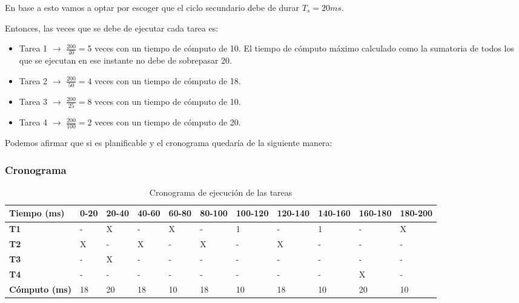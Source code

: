 \documentclass[a4paper,12pt]{article}
\begin{document}
En base a esto vamos a optar por escoger que el ciclo secundario debe de durar $T_s=20ms$.

Entonces, las veces que se debe de ejecutar cada tarea es:
\begin{itemize}
    \item Tarea 1 $\rightarrow$ $\frac{200}{40} = 5$ veces con un tiempo de cómputo de 10. El tiempo de cómputo máximo calculado como la sumatoria de todos los que se ejecutan en ese instante no debe de sobrepasar 20. 
    \item Tarea 2 $\rightarrow$ $\frac{200}{50} = 4$ veces con un tiempo de cómputo de 18.
    \item Tarea 3 $\rightarrow$ $\frac{200}{25} = 8$ veces con un tiempo de cómputo de 10.
    \item Tarea 4 $\rightarrow$ $\frac{200}{100} = 2$ veces con un tiempo de cómputo de 20.
\end{itemize}


Podemos afirmar que si es planificable y el cronograma quedaría de la siguiente manera:



\subsubsection{Cronograma}



\begin{table}[H]
    \centering
    \begin{tabular}{|p{1.6cm}|p{1.2cm}|p{1.2cm}|p{1.2cm}|p{1.2cm}|p{1.2cm}|p{1.2cm}|p{1.2cm}|p{1.2cm}|p{1.2cm}|p{1.2cm}|}
    \hline
    \textbf{Tiempo (ms)} & 0-20 & 20-40 & 40-60 & 60-80 & 80-100 & 100-120 & 120-140 & 140-160 & 160-180 & 180-200 \\ \hline
    \textbf{T1} & - & X & - & X & - & 1 & - & 1 & - & X \\ \hline
    \textbf{T2} & X & - & X & - & X & - & X & - & - & - \\ \hline
    \textbf{T3} & - & X & - & - & - & - & - & - & - & - \\ \hline
    \textbf{T4} & - & - & - & - & - & - & - & - & X & - \\ \hline
    \textbf{Cómputo (ms)} & 18 & 20 & 18 & 10 & 18 & 10 & 18 & 10 & 20 & 10 \\ \hline
    \end{tabular}
    \caption{Cronograma de ejecución de las tareas}
\end{table}
    
\end{document}

